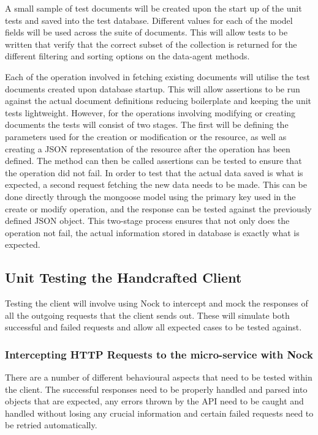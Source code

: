 A small sample of test documents will be created upon the start up of the unit tests and saved into the test database. Different values for each of the model fields will be used across the suite of documents. This will allow tests to be written that verify that the correct subset of the collection is returned for the different filtering and sorting options on the data-agent methods.

Each of the operation involved in fetching existing documents will utilise the test documents created upon database startup. This will allow assertions to be run against the actual document definitions reducing boilerplate and keeping the unit tests lightweight. However, for the operations involving modifying or creating documents the tests will consist of two stages. The first will be defining the parameters used for the creation or modification or the resource, as well as creating a JSON representation of the resource after the operation has been defined. The method can then be called assertions can be tested to ensure that the operation did not fail. In order to test that the actual data saved is what is expected, a second request fetching the new data needs to be made. This can be done directly through the mongoose model using the primary key used in the create or modify operation, and the response can be tested against the previously defined JSON object. This two-stage process ensures that not only does the operation not fail, the actual information stored in database is exactly what is expected.
\subsection{Unit Testing the Handcrafted Client}
Testing the client will involve using Nock to intercept and mock the responses of all the outgoing requests that the client sends out. These will simulate both successful and failed requests and allow all expected cases to be tested against.
\subsubsection{Intercepting HTTP Requests to the micro-service with Nock}
There are a number of different behavioural aspects that need to be tested within the client. The successful responses need to be properly handled and parsed into objects that are expected, any errors thrown by the API need to be caught and handled without losing any crucial information and certain failed requests need to be retried automatically.

